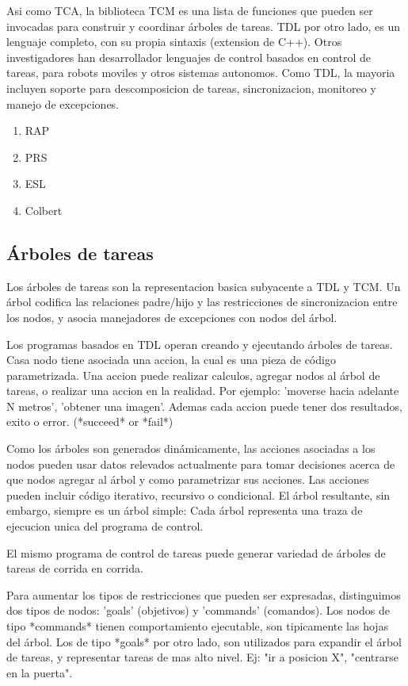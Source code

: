 \documentclass[a4paper, 11pt, oneside]{article}
\begin{document}
Asi como TCA, la biblioteca TCM es una lista de funciones que pueden ser 
invocadas para construir y coordinar árboles de tareas.
TDL por otro lado, es un lenguaje completo, con su propia sintaxis 
(extension de C++).
Otros investigadores han desarrollador lenguajes de control basados en 
control de tareas, para robots moviles y otros sistemas autonomos.
Como TDL, la mayoria incluyen soporte para descomposicion de tareas, 
sincronizacion, monitoreo y manejo de excepciones.

\begin{enumerate}
\item RAP
\item PRS
\item ESL
\item Colbert
\end{enumerate}

\subsection{Árboles de tareas}

Los árboles de tareas son la representacion basica subyacente a TDL y TCM. 
Un árbol codifica las relaciones padre/hijo y
las restricciones de sincronizacion entre los nodos, y asocia manejadores 
de excepciones con nodos del árbol.

Los programas basados en TDL operan creando y ejecutando árboles de tareas. 
Casa nodo tiene asociada una accion, la cual es una pieza de código 
parametrizada.
Una accion puede realizar calculos, agregar nodos al árbol de tareas, o 
realizar una accion en la realidad. Por
ejemplo: 'moverse hacia adelante N metros', 'obtener una imagen'. 
Ademas cada accion puede tener dos resultados, exito o error.
(*succeed* or *fail*)

Como los árboles son generados dinámicamente, las acciones asociadas a los 
nodos pueden usar datos relevados actualmente
para tomar decisiones acerca de que nodos agregar al árbol y como 
parametrizar sus acciones.
Las acciones pueden incluir código iterativo, recursivo o condicional.
El árbol resultante, sin embargo, siempre es un árbol simple: Cada árbol 
representa una traza de ejecucion unica del programa de control.

El mismo programa de control de tareas puede generar variedad de árboles de 
tareas de corrida en corrida.

Para aumentar los tipos de restricciones que pueden ser expresadas, 
distinguimos dos tipos de nodos: 'goals' (objetivos) y 'commands' (comandos).
Los nodos de tipo *commands* tienen comportamiento ejecutable, son tipicamente
 las hojas del árbol.
Los de tipo *goals* por otro lado, son utilizados para expandir el árbol de 
tareas, y representar tareas de mas alto nivel. 
Ej: "ir a posicion X", "centrarse en la puerta".
\end{document}
